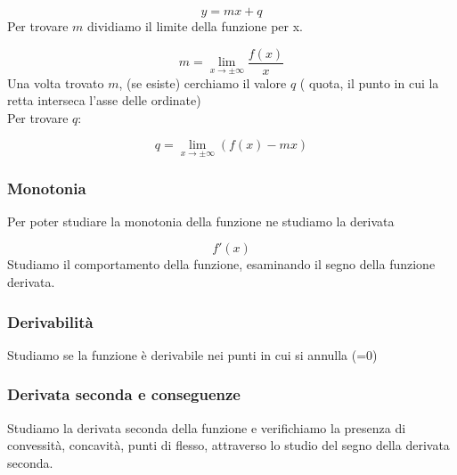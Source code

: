 \documentclass[../analisi.tex]{subfiles}
\begin{document}
\begin{equation}
	y = mx + q
\end{equation}
Per trovare $ m $ dividiamo il limite della funzione per x.

\begin{equation}
	m = \lim_{x \to \pm\infty} \frac{f(x)}{x}  
\end{equation}
Una volta trovato $ m $, (se esiste) cerchiamo il valore $ q $ ( quota, 
il punto in cui la retta interseca l'asse delle ordinate)\\
Per trovare $ q $:


\begin{equation}
	q = \lim_{x \to \pm\infty} ( f(x) - mx ) 
\end{equation}
	

\subsubsection{Monotonia}
Per poter studiare la monotonia della funzione ne studiamo la derivata

\begin{equation}
	f' ( x ) 
\end{equation}
Studiamo il comportamento della funzione, esaminando il segno della funzione
derivata.


\subsubsection{Derivabilità}
Studiamo se la funzione è derivabile nei punti in cui si annulla (=0)


\subsubsection{Derivata seconda e conseguenze}
Studiamo la derivata seconda della funzione e verifichiamo la presenza
di convessità, concavità, punti di flesso, attraverso lo 
studio del segno della derivata seconda.
\end{document}
